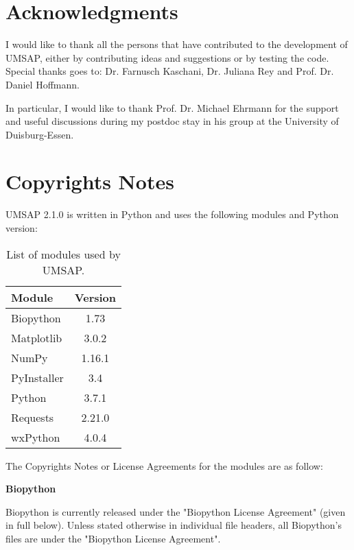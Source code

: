 \newpage

\section{Acknowledgments}

I would like to thank all the persons that have contributed to the development of UMSAP, either by contributing ideas and suggestions or by testing the code. Special thanks goes to: Dr. Farnusch Kaschani, Dr. Juliana Rey and Prof. Dr. Daniel Hoffmann.

In particular, I would like to thank Prof. Dr. Michael Ehrmann for the support and useful discussions during my postdoc stay in his group at the University of Duisburg-Essen. 

\section{Copyrights Notes}

UMSAP \num[parse-numbers=false]{2.1.0} is written in Python and uses the following modules and Python version:
\begin{table}[h!]
	\centering
	\begin{tabular}{l c}
		\hline
		Module & Version \\
		\hline
        Biopython   & \num{1.73} \\
        Matplotlib  & \num[parse-numbers=false]{3.0.2} \\
        NumPy       & \num[parse-numbers=false]{1.16.1}\\
        PyInstaller & \num{3.4}\\
        Python      & \num[parse-numbers=false]{3.7.1}\\
        Requests    & \num[parse-numbers=false]{2.21.0}\\
        wxPython    & \num[parse-numbers=false]{4.0.4}\\
        \hline		
	\end{tabular}
	\caption[List of modules used by UMSAP]{List of modules used by UMSAP.}
	\label{table:umsappythonmodules}
\end{table}

The Copyrights Notes or License Agreements for the modules are as follow:

\textbf{Biopython}

Biopython is currently released under the "Biopython License Agreement" (given in full below). Unless stated otherwise in individual file headers, all Biopython's files are under the "Biopython License Agreement".

